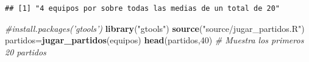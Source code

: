 \documentclass[]{article}
\newenvironment{Shaded}{\begin{snugshade}}{\end{snugshade}}
\newcommand{\CommentTok}[1]{\textcolor[rgb]{0.56,0.35,0.01}{\textit{#1}}}
\newcommand{\DecValTok}[1]{\textcolor[rgb]{0.00,0.00,0.81}{#1}}
\newcommand{\KeywordTok}[1]{\textcolor[rgb]{0.13,0.29,0.53}{\textbf{#1}}}
\newcommand{\NormalTok}[1]{#1}
\newcommand{\StringTok}[1]{\textcolor[rgb]{0.31,0.60,0.02}{#1}}
\begin{document}
\begin{verbatim}
## [1] "4 equipos por sobre todas las medias de un total de 20"
\end{verbatim}

\begin{Shaded}
\begin{Highlighting}[]
\CommentTok{#install.packages('gtools')}
\KeywordTok{library}\NormalTok{(}\StringTok{"gtools"}\NormalTok{)}
\KeywordTok{source}\NormalTok{(}\StringTok{"source/jugar_partidos.R"}\NormalTok{)}
\NormalTok{partidos=}\KeywordTok{jugar_partidos}\NormalTok{(equipos)}
\KeywordTok{head}\NormalTok{(partidos,}\DecValTok{40}\NormalTok{) }\CommentTok{# Muestra los primeros 20 partidos  }
\end{Highlighting}
\end{Shaded}
\end{document}
